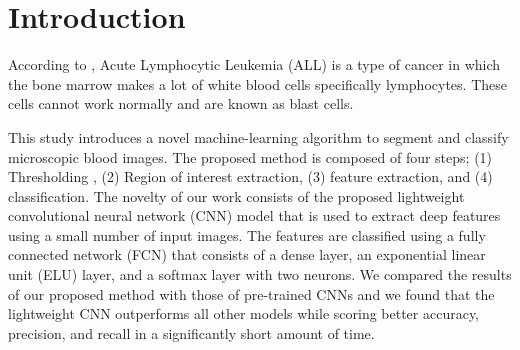 \documentclass[diagnostics,article,submit,pdftex,moreauthors]{Definitions/mdpi}
\begin{document}

\section{Introduction}
According to \cite{key}, Acute Lymphocytic Leukemia (ALL) is a type of cancer in which the bone marrow makes a lot of white blood cells specifically lymphocytes. These cells cannot work normally and are known as blast cells. 

This study introduces a novel machine-learning algorithm to segment and classify microscopic blood images. The proposed method is composed of four steps; (1) Thresholding \cite{kohler1981segmentation}, (2) Region of interest extraction, (3) feature extraction, and (4) classification. The novelty of our work consists of the proposed lightweight convolutional neural network \cite{o2015introduction} (CNN) model that is used to extract deep features using a small number of input images. The features are classified using a fully connected network (FCN) that consists of a dense layer, an exponential linear unit \cite{clevert2015fast} (ELU) layer, and a softmax layer with two neurons. We compared the results of our proposed method with those of pre-trained CNNs and we found that the lightweight CNN outperforms all other models while scoring better accuracy, precision, and recall in a significantly short amount of time. 

\end{document}
